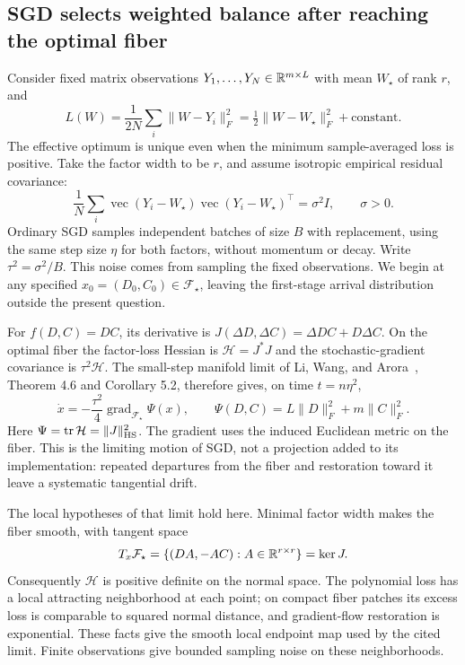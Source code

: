 \subsection{SGD selects weighted balance after reaching the optimal fiber}
Consider fixed matrix observations $Y_1,\ldots,Y_N\in\mathbb R^{m\times L}$ with mean $W_\star$ of rank $r$, and
\[
 L(W)=\frac1{2N}\sum_i\|W-Y_i\|_F^2
      =\tfrac12\|W-W_\star\|_F^2+\text{constant}.
\]
The effective optimum is unique even when the minimum sample-averaged loss is positive. Take the factor width to be $r$, and assume isotropic empirical residual covariance:
\[
 \frac1N\sum_i\operatorname{vec}(Y_i-W_\star)
 \operatorname{vec}(Y_i-W_\star)^\top=\sigma^2 I,\qquad \sigma>0.
\]
Ordinary SGD samples independent batches of size $B$ with replacement, using the same step size $\eta$ for both factors, without momentum or decay. Write $\tau^2=\sigma^2/B$. This noise comes from sampling the fixed observations. We begin at any specified $x_0=(D_0,C_0)\in\mathcal F_\star$, leaving the first-stage arrival distribution outside the present question.

For $f(D,C)=DC$, its derivative is $J(\Delta D,\Delta C)=\Delta D C+D\Delta C$. On the optimal fiber the factor-loss Hessian is $\mathcal H=J^*J$ and the stochastic-gradient covariance is $\tau^2\mathcal H$. The small-step manifold limit of Li, Wang, and Arora~\cite{lwa}, Theorem 4.6 and Corollary 5.2, therefore gives, on time $t=n\eta^2$,
\begin{equation}\label{eq:sgdflow}
 \dot x=-\frac{\tau^2}{4}\operatorname{grad}_{\mathcal F_\star}\Psi(x),
 \qquad \Psi(D,C)=L\|D\|_F^2+m\|C\|_F^2.
\end{equation}
Here $\Psi=\operatorname{tr}\mathcal H=\|J\|_{\rm HS}^2$. The gradient uses the induced Euclidean metric on the fiber. This is the limiting motion of SGD, not a projection added to its implementation: repeated departures from the fiber and restoration toward it leave a systematic tangential drift.

The local hypotheses of that limit hold here. Minimal factor width makes the fiber smooth, with tangent space
\[
 T_x\mathcal F_\star=\{(DA,-AC):A\in\mathbb R^{r\times r}\}=\ker J.
\]
Consequently $\mathcal H$ is positive definite on the normal space. The polynomial loss has a local attracting neighborhood at each point; on compact fiber patches its excess loss is comparable to squared normal distance, and gradient-flow restoration is exponential. These facts give the smooth local endpoint map used by the cited limit. Finite observations give bounded sampling noise on these neighborhoods.

